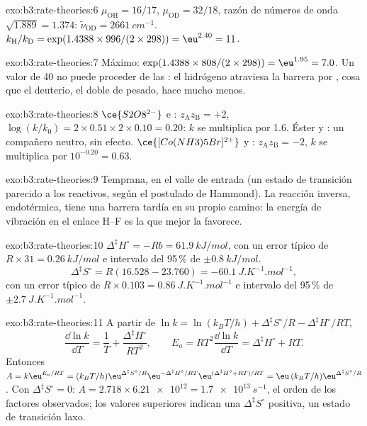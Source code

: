 \begin{solution}{exo:b3:rate-theories:6}
$\mu_{\mathrm{OH}} = 16/17$, $\mu_{\mathrm{OD}} = 32/18$, razón de números de onda $\sqrt{1.889} = 1.374$:
$\tilde\nu_{\mathrm{OD}} = \qty{2661}{cm^{-1}}$. $k_{\mathrm H}/k_{\mathrm D} = \exp(1.4388 \times 996/(2 \times 298)) = \eu^{2.40} = 11$.
\end{solution}

\begin{solution}{exo:b3:rate-theories:7}
Máximo: $\exp(1.4388 \times 808/(2 \times 298)) = \eu^{1.95} = 7.0$. Un valor de 40 no puede proceder de las
: el hidrógeno atraviesa la barrera por , cosa que el deuterio,
el doble de pesado, hace mucho menos.
\end{solution}

\begin{solution}{exo:b3:rate-theories:8}
$\ce{S2O8^{2-}}$ e : $z_{\mathrm A}z_{\mathrm B} = +2$, $\log(k/k_0) = 2 \times 0.51 \times 2 \times 0.10 = 0.20$: $k$
se multiplica por 1.6. Éster y : un compañero neutro, sin efecto.
$\ce{[Co(NH3)5Br]^{2+}}$ y : $z_{\mathrm A}z_{\mathrm B} = -2$, $k$ se multiplica por $10^{-0.20} = 0.63$.
\end{solution}

\begin{solution}{exo:b3:rate-theories:9}
Temprana, en el valle de entrada (un estado de transición parecido a los reactivos, según el postulado
de Hammond). La reacción inversa, endotérmica, tiene una barrera tardía en su propio
camino: la energía de vibración en el enlace H--F es la que mejor la favorece.
\end{solution}

\begin{solution}{exo:b3:rate-theories:10}
$\Delta^{\ddagger}H^\circ = -Rb = \qty{61.9}{kJ/mol}$, con un error típico de $R \times 31 = \qty{0.26}{kJ/mol}$ e
intervalo del 95\,\% de $\pm\qty{0.8}{kJ/mol}$.
\[
  \Delta^{\ddagger}S^\circ = R(16.528 - 23.760) = \qty{-60.1}{J.K^{-1}.mol^{-1}},
\]
con un error típico de $R \times 0.103 = \qty{0.86}{J.K^{-1}.mol^{-1}}$ e intervalo del 95\,\% de $\pm\qty{2.7}{J.K^{-1}.mol^{-1}}$.
\end{solution}

\begin{solution}{exo:b3:rate-theories:11}
A partir de $\ln k = \ln(k_BT/h) + \Delta^{\ddagger}S^\circ/R - \Delta^{\ddagger}H^\circ/RT$,
\[
  \frac{\dd\ln k}{\dd T} = \frac1T + \frac{\Delta^{\ddagger}H^\circ}{RT^2}, \qquad
  E_a = RT^2\frac{\dd\ln k}{\dd T} = \Delta^{\ddagger}H^\circ + RT .
\] Entonces $A = k\eu^{E_a/RT} = (k_BT/h)\eu^{\Delta^{\ddagger}S^\circ/R}\eu^{-\Delta^{\ddagger}H^\circ/RT}\eu^{(\Delta^{\ddagger}H^\circ + RT)/RT} =
\eu\,(k_BT/h)\eu^{\Delta^{\ddagger}S^\circ/R}$. Con $\Delta^{\ddagger}S^\circ = 0$: $A = 2.718 \times \num{6.21e12} = \qty{1.7e13}{s^{-1}}$, el
orden de los factores observados; los valores superiores indican una $\Delta^{\ddagger}S^\circ$ positiva, un
estado de transición laxo.
\end{solution}

